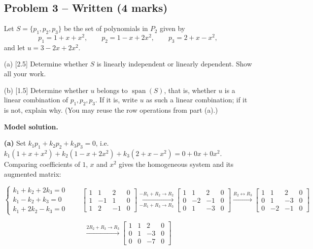\documentclass[11pt,a4paper]{article}
\begin{document}
\subsection*{Problem 3 -- Written (4 marks)}
Let $S=\{p_1,p_2,p_3\}$ be the set of polynomials in $P_2$ given by\[p_1=1+x+x^{2},\qquad p_2=1-x+2x^{2},\qquad p_3=2+x-x^{2},\]and let $u=3-2x+2x^{2}$.\par (a) [2.5] Determine whether $S$ is linearly independent or linearly dependent. Show all your work.\par (b) [1.5] Determine whether $u$ belongs to $\operatorname{span}(S)$, that is, whether $u$ is a linear combination of $p_1,p_2,p_3$. If it is, write $u$ as such a linear combination; if it is not, explain why. (You may reuse the row operations from part (a).)\par
\textbf{Model solution.}\par{\color{WorkBlue}\textbf{(a)} Set $k_1p_1+k_2p_2+k_3p_3=0$, i.e. $k_1(1+x+x^{2})+k_2(1-x+2x^{2})+k_3(2+x-x^{2})=0+0x+0x^{2}$. Comparing coefficients of $1$, $x$ and $x^{2}$ gives the homogeneous system and its augmented matrix:

\[ \begin{cases}k_1+k_2+2k_3=0\\ k_1-k_2+k_3=0\\ k_1+2k_2-k_3=0\end{cases} \qquad \left[\begin{array}{ccc|c} 1 & 1 & 2 & 0 \\ 1 & -1 & 1 & 0 \\ 1 & 2 & -1 & 0 \end{array}\right] \xrightarrow[-R_1+R_3 \to R_3]{-R_1+R_2 \to R_2} \left[\begin{array}{ccc|c} 1 & 1 & 2 & 0 \\ 0 & -2 & -1 & 0 \\ 0 & 1 & -3 & 0 \end{array}\right] \xrightarrow{R_2 \leftrightarrow R_3} \left[\begin{array}{ccc|c} 1 & 1 & 2 & 0 \\ 0 & 1 & -3 & 0 \\ 0 & -2 & -1 & 0 \end{array}\right] \]

\[  \xrightarrow{2R_2+R_3 \to R_3} \left[\begin{array}{ccc|c} 1 & 1 & 2 & 0 \\ 0 & 1 & -3 & 0 \\ 0 & 0 & -7 & 0 \end{array}\right] \]

}
\end{document}
